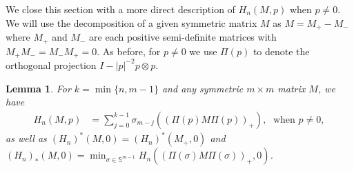 \documentclass[reqno]{amsart}
\newtheorem{lemma}[theorem]{Lemma}
\numberwithin{equation}{section}
\begin{document}
We close this section with a more direct description of $H_n(M,p)$ when $p\neq 0$. We will use the decomposition of a given symmetric matrix $M$ as $M = M_+-M_-$ where $M_+$ and $M_-$ are each positive semi-definite matrices with $M_+M_-=M_-M_+ = 0$. As before, for $p \neq 0$ we use $\Pi(p)$ to denote the orthogonal projection $I- |p|^{-2}p\otimes p$.

\begin{lemma}\label{l:H n is sum of positive eigenvalues}
For $k = \min\{n,m-1\}$ and any symmetric $m\times m$ matrix $M$, we have
\begin{align}\label{e:identity for Hn}
  H_n(M,p) & = \sum_{j=0}^{k-1} \sigma_{m-j}( (\Pi(p)M\Pi(p))_+),\;\text{ when } p\neq 0,
\end{align}
as well as $(H_n)^*(M,0) = (H_n)^*(M_+,0)$ and  $(H_n)_*(M,0) = \min_{\sigma \in \mathbb{S}^{m-1}} H_n((\Pi(\sigma)M \Pi(\sigma))_+,0)$.

\end{lemma}
\end{document}
